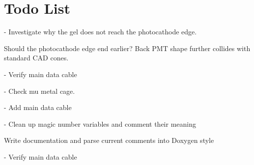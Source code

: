 \chapter{Todo List}
\hypertarget{todo}{}\label{todo}

\begin{DoxyRefList}
\item[Member \doxylink{class_d_e_g_g_a6af6697e49866ad1c9c15a8182b86cbf}{DEGG\+::DEGG} (G4bool p\+\_\+place\+Harness=true)]\label{todo__todo000003}%
%
-\/ Investigate why the gel does not reach the photocathode edge.
\begin{DoxyItemize}
\item Should the photocathode edge end earlier? Back PMT shape further collides with \textquotesingle{}standard\textquotesingle{} CAD cones.  
\end{DoxyItemize}
\item[Member \doxylink{class_d_egg_harness_af47314ae371c5e3bef6e690c0588349b}{DEgg\+Harness\+::DEgg\+Harness} (\doxylink{class_d_e_g_g}{DEGG} \texorpdfstring{$\ast$}{*}p\+DEGG)]\label{todo__todo000004}%
%
-\/ Verify main data cable  
\item[Member \doxylink{class_d_o_m_acc106b0711597a156073a5f2fe3e852e}{DOM\+::DOM} (G4bool p\+\_\+place\+Harness=true, G4bool p\+\_\+deepcore=false)]\label{todo__todo000011}%
%
-\/ Check mu metal cage.  
\item[Member \doxylink{class_d_o_m_harness_afe8ca76b7535f76bb80492cde5bfa8f5}{DOMHarness\+::DOMHarness} (\doxylink{class_d_o_m}{DOM} \texorpdfstring{$\ast$}{*}p\+DOM)]\label{todo__todo000012}%
%
-\/ Add main data cable  
\item[Member \doxylink{class_l_o_m16_a34ba419fa385afb5fa2efeeb870f1a05}{LOM16\+::LOM16} (G4bool p\+\_\+place\+Harness=true)]\label{todo__todo000005}%
%
-\/ Clean up magic number variables and comment their meaning
\begin{DoxyItemize}
\item Write documentation and parse current comments into Doxygen style  
\end{DoxyItemize}
\item[Member \doxylink{class_l_o_m16_harness_aad977edb7ed722ea42eeeb89ca2ff818}{LOM16\+Harness\+::LOM16\+Harness} (\doxylink{class_l_o_m16}{LOM16} \texorpdfstring{$\ast$}{*}p\+LOM16)]\label{todo__todo000006}%
%
-\/ Verify main data cable  

\end{DoxyRefList}
